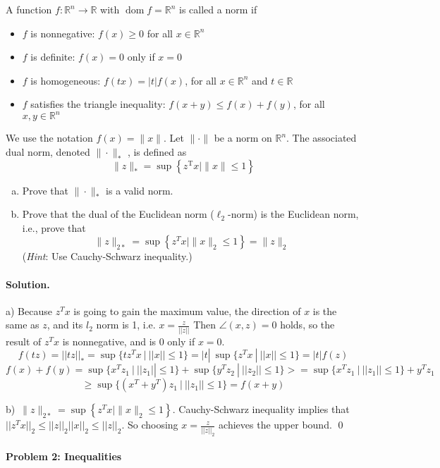 \documentclass[a4paper]{article}
\newenvironment{solution}
{\color{blue} \paragraph{Solution.}}
{\newline \qed}
\begin{document}
\noindent
A function  $f: \mathbb{R}^{n} \rightarrow \mathbb{R} $ with  $\operatorname{dom} f=\mathbb{R}^{n} $ is called a norm if
\begin{itemize}
    \item $f$  is nonnegative:  $f(x) \geq 0 $ for all  $x \in \mathbb{R}^{n}$
    \item $f$  is definite:  $f(x)=0$  only if  $x=0$
    \item  $f$  is homogeneous:  $f(t x)=|t| f(x)$, for all $x \in \mathbb{R}^{n}$  and  $t \in \mathbb{R}$
    \item $f$  satisfies the triangle inequality:  $f(x+y) \leq f(x)+f(y)$, for all $ x, y \in \mathbb{R}^{n}$
\end{itemize}
We use the notation  $f(x)=\|x\|$. Let  $\|\cdot\|$  be a norm on  $\mathbb{R}^{n}$. The associated dual norm, denoted $\|\cdot\|_{*}$ , is defined as
$$\|z\|_{*}=\sup \left\{z^{\mathrm{T}} x \mid\|x\| \leq 1\right\}$$
\begin{enumerate}[a)]
    \item  Prove that  $\|\cdot\|_{*}$  is a valid norm.
    \item Prove that the dual of the Euclidean norm  ($\ell_{2}$-norm) is the Euclidean norm, i.e., prove that
          $$\|z\|_{2 *}=\sup \left\{z^{T} x \mid\|x\|_{2} \leq 1\right\}=\|z\|_{2}$$
          (\emph{Hint}: Use Cauchy-Schwarz inequality.)
\end{enumerate}
\begin{solution}
    a) Because $z^T x$ is going to gain the maximum value, the direction of $x$ is the same as $z$, and its $l_2$ norm is 1, i.e. $x = \frac{z}{||z||}$ Then $\angle (x , z) = 0$ holds, so the result of $z^T x$ is nonnegative, and is 0 only if $x=0$.
    $$f(tz) = ||tz||_* = \sup\{t z^T x \ | \ ||x|| \le 1\} = |t|\ \sup\{z^T x \ | \ ||x|| \le 1\} = |t|f(z)$$
    $$f(x) + f(y) = \sup\{x^T z_1 \ | \ ||z_1|| \le 1\} + \sup\{y^T z_2 \ | \ ||z_2|| \le 1\} >= \sup\{x^T z_1 \ | \ ||z_1|| \le 1\} + y^T z_1$$
    $$\geq \sup\{(x^T + y^T) z_1 \ | \ ||z_1|| \le 1\} = f(x+y)$$

    b)\ $\|z\|_{2 *}=\sup \left\{z^{T} x \mid\|x\|_{2} \leq 1\right\}$. Cauchy-Schwarz inequality implies that $||z^T x||_2 \leq ||z||_2||x||_2 \leq ||z||_2$. So choosing $x = \frac{z}{||z||_2}$ achieves the upper bound.
\end{solution}


\paragraph{Problem 2: Inequalities}
~\\
\end{document}
